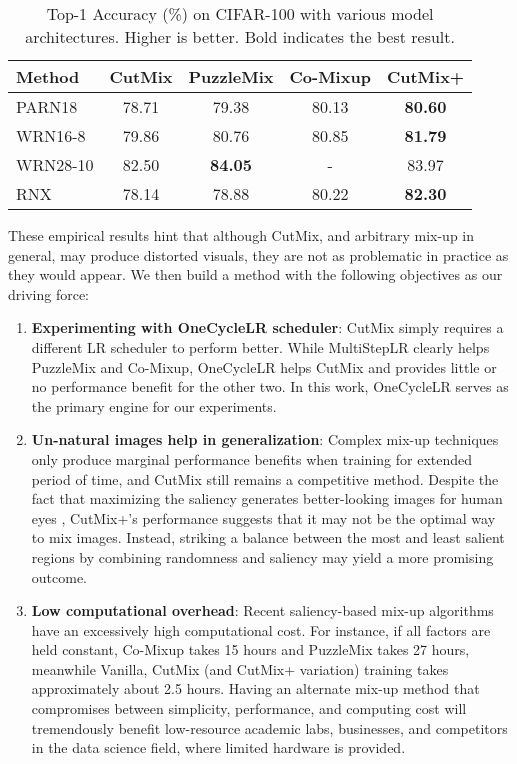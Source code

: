 \documentclass[letterpaper]{article} \usepackage[submission]{aaai23}  \usepackage{times}  \usepackage{helvet}  \usepackage{courier}  \usepackage[hyphens]{url}  \usepackage{graphicx} \urlstyle{rm} \def\UrlFont{\rm}  \usepackage{natbib}  \usepackage{caption} \frenchspacing  \setlength{\pdfpagewidth}{8.5in} \setlength{\pdfpageheight}{11in}
\newcommand{\cutmix}{{CutMix}}
\newcommand{\puzzlemix}{{PuzzleMix}}
\newcommand{\comixup}{{Co-Mixup}}
\newcommand{\cifar}{CIFAR-100}
\begin{document}
    \begin{table}[t]
\centering
  \begin{adjustbox}{width=1\columnwidth}
  \begin{tabular}{lccc|c}
    \hline
    Method & CutMix & PuzzleMix & Co-Mixup & CutMix+ \\ \hline
    PARN18 & 78.71 & 79.38 & 80.13 & \textbf{80.60} \\ 
    WRN16-8 & 79.86 & 80.76 & 80.85 & \textbf{81.79} \\ 
    WRN28-10 & 82.50 & \textbf{84.05} & - & 83.97 \\ 
    RNX & 78.14 & 78.88 & 80.22 & \textbf{82.30} \\ \hline
    \end{tabular}
    
    \end{adjustbox}
  
  \caption{Top-1 Accuracy (\%) on \cifar{} with various model architectures. Higher is better. Bold indicates the best result.}
  \label{tab:schedulers}
\end{table}

These empirical results hint that although \cutmix{}, and arbitrary mix-up in general, may produce distorted visuals, they are not as problematic in practice as they would appear. We then build a method with the following objectives as our driving force:
\begin{enumerate}
    \item \textbf{Experimenting with OneCycleLR scheduler}: \cutmix{} simply requires a different LR scheduler to perform better. While MultiStepLR clearly helps \puzzlemix{} and \comixup{}, OneCycleLR helps \cutmix{} and provides little or no performance benefit for the other two. In this work, OneCycleLR serves as the primary engine for our experiments.
    
    \item \textbf{Un-natural images help in generalization}: Complex mix-up techniques only produce marginal performance benefits when training for extended period of time, and \cutmix{} still remains a competitive method. Despite the fact that maximizing the saliency generates better-looking images for human eyes \cite{kim2020puzzlemix,kim2021comixup}, \cutmix{}+'s performance suggests that it may not be the optimal way to mix images. Instead, striking a balance between the most and least salient regions by combining randomness and saliency may yield a more promising outcome.
    
    \item \textbf{Low computational overhead}: Recent saliency-based mix-up algorithms have an excessively high computational cost. For instance, if all factors are held constant, \comixup{} takes 15 hours and \puzzlemix{} takes 27 hours, meanwhile Vanilla, \cutmix{} (and \cutmix{}+ variation) training takes approximately about 2.5 hours. Having an alternate mix-up method that compromises between simplicity, performance, and computing cost will tremendously benefit low-resource academic labs, businesses, and competitors in the data science field, where limited hardware is provided.
\end{enumerate} 
\end{document}
